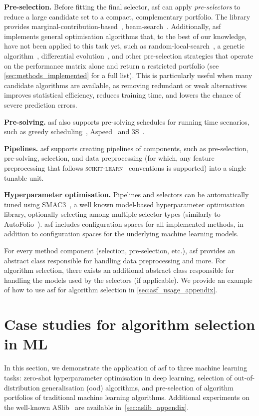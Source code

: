 \textbf{Pre-selection.}
Before fitting the final selector, \gls{asf} can apply \emph{pre-selectors} to reduce a large candidate set to a compact, complementary portfolio.
The library provides marginal-contribution-based~\citep{XuEtAl08}, beam-search~\citep{BacEtAl22}. Additionally, \gls{asf} implements general optimisation algorithms that, to the best of our knowledge, have not been applied to this task yet, such as random-local-search~\citep{HutEtAl11}, a genetic algorithm~\citep{FraBur70}, differential evolution~\citep{PriEtAl05}, and other pre-selection strategies that operate on the performance matrix alone and return a restricted portfolio (see \autoref{sec:methods_implemented} for a full list).
This is particularly useful when many candidate algorithms are available, as removing redundant or weak alternatives improves statistical efficiency, reduces training time, and lowers the chance of severe prediction errors.

\textbf{Pre-solving.}
\Gls{asf} also supports pre-solving schedules for running time scenarios, such as greedy scheduling~\citep{XuEtAl08}, Aspeed~\citep{HooEtAl12} and 3S~\citep{KadEtAl11}.

\textbf{Pipelines.} \gls{asf} supports creating pipelines of components, such as pre-selection, pre-solving, selection, and data preprocessing (for which, any feature preprocessing that follows \textsc{scikit-learn}~\citep{PedEtAl11} conventions is supported) into a single tunable unit.

\textbf{Hyperparameter optimisation.}
Pipelines and selectors can be automatically tuned using SMAC3~\citep{HutEtAl11,LinEtAl22}, a well known model-based hyperparameter optimisation library, optionally selecting among multiple selector types (similarly to AutoFolio~\citep{LinEtAl15}). \Gls{asf} includes configuration spaces for all implemented methods, in addition to configuration spaces for the underlying machine learning models.

For every method component (selection, pre-selection, etc.), \gls{asf} provides an abstract class responsible for handling data preprocessing and more. For algorithm selection, there exists an additional abstract class responsible for handling the models used by the selectors (if applicable). We provide an example of how to use \gls{asf} for algorithm selection in \autoref{sec:asf_usage_appendix}.



\section{Case studies for algorithm selection in ML}
\label{sec:experiments}
In this section, we demonstrate the application of \gls{asf} to three machine learning tasks: zero-shot hyperparameter optimisation in deep learning, selection of out-of-distribution generalisation (\gls{ood}) algorithms, and pre-selection of algorithm portfolios of traditional machine learning algorithms. 
Additional experiments on the well-known ASlib~\citep{BisEtAl16} are available in~\autoref{sec:aslib_appendix}.

